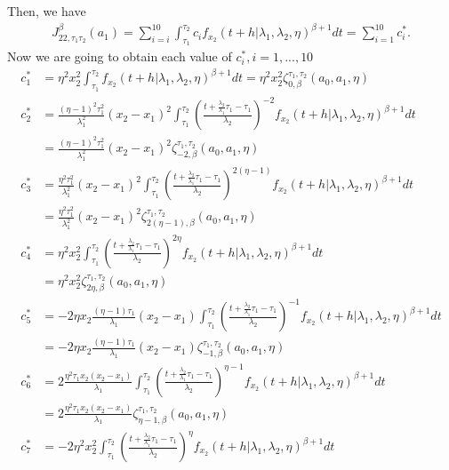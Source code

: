 \documentclass{article}
\begin{document}
Then, we have
\begin{align*}
J_{22,\tau_1\tau_2}^{\beta}(a_1)=\sum_{i=i}^{10}\int_{\tau_1}^{\tau_2} c_i f_{x_2}(t+h|\lambda_1,\lambda_2,\eta)^{\beta+1}dt=\sum_{i=1}^{10}c_i^*.
\end{align*}
Now we are going to obtain each value of $c_i^*, i=1, ..., 10$
\begin{align*}
c_1^*&=\eta^2 x_2^2\int_{\tau_1}^{\tau_2}  f_{x_2}(t+h|\lambda_1,\lambda_2,\eta)^{\beta+1}dt=\eta^2 x_2^2 \zeta_{0,\beta}^{\tau_1,\tau_2}(a_0,a_1,\eta)
\\
c_2^*&=\frac{(\eta-1)^2 \tau_1^2}{\lambda_1^2}(x_2-x_1)^2\int_{\tau_1}^{\tau_2} \left(\frac{t+\frac{\lambda_2}{\lambda_1}\tau_1-\tau_1}{\lambda_2}\right)^{-2} f_{x_2}(t+h|\lambda_1,\lambda_2,\eta)^{\beta+1}dt
	\\
	&=\frac{(\eta-1)^2 \tau_1^2}{\lambda_1^2}(x_2-x_1)^2\zeta_{-2,\beta}^{\tau_1,\tau_2}(a_0,a_1,\eta)
\\
c_3^*&=\frac{\eta^2\tau_1^2}{\lambda_1^2}(x_2-x_1)^2\int_{\tau_1}^{\tau_2} \left(\frac{t+\frac{\lambda_2}{\lambda_1}\tau_1-\tau_1}{\lambda_2}\right)^{2(\eta-1)} f_{x_2}(t+h|\lambda_1,\lambda_2,\eta)^{\beta+1}dt
	\\
	&=\frac{\eta^2\tau_1^2}{\lambda_1^2}(x_2-x_1)^2\zeta_{2(\eta-1),\beta}^{\tau_1,\tau_2}(a_0,a_1,\eta)
\\
c_4^*&=\eta^2 x_2^2\int_{\tau_1}^{\tau_2} \left(\frac{t+\frac{\lambda_2}{\lambda_1}\tau_1-\tau_1}{\lambda_2}\right)^{2\eta} f_{x_2}(t+h|\lambda_1,\lambda_2,\eta)^{\beta+1}dt
	\\
	&=\eta^2 x_2^2 \zeta_{2\eta,\beta}^{\tau_1,\tau_2}(a_0,a_1,\eta)
\\
c_5^*&=-2\eta x_2 \frac{(\eta-1)\tau_1}{\lambda_1}(x_2-x_1)\int_{\tau_1}^{\tau_2} \left(\frac{t+\frac{\lambda_2}{\lambda_1}\tau_1-\tau_1}{\lambda_2}\right)^{-1} f_{x_2}(t+h|\lambda_1,\lambda_2,\eta)^{\beta+1}dt
	\\
	&=-2\eta x_2 \frac{(\eta-1)\tau_1}{\lambda_1}(x_2-x_1) \zeta_{-1,\beta}^{\tau_1,\tau_2}(a_0,a_1,\eta)
\\
c_6^*&=2\frac{\eta^2\tau_1x_2(x_2-x_1)}{\lambda_1}\int_{\tau_1}^{\tau_2} \left(\frac{t+\frac{\lambda_2}{\lambda_1}\tau_1-\tau_1}{\lambda_2}\right)^{\eta-1} f_{x_2}(t+h|\lambda_1,\lambda_2,\eta)^{\beta+1}dt
	\\
	&=2\frac{\eta^2\tau_1x_2(x_2-x_1)}{\lambda_1} \zeta_{\eta-1,\beta}^{\tau_1,\tau_2}(a_0,a_1,\eta)
\\
c_7^*&=-2\eta^2 x_2^2\int_{\tau_1}^{\tau_2} \left(\frac{t+\frac{\lambda_2}{\lambda_1}\tau_1-\tau_1}{\lambda_2}\right)^{\eta} f_{x_2}(t+h|\lambda_1,\lambda_2,\eta)^{\beta+1}dt

\end{align*}
\end{document}
